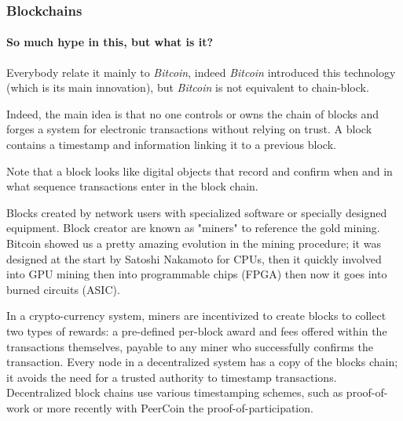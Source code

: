 
\subsubsection{Blockchains}
\paragraph{So much hype in this, but what is it?}
Everybody relate it mainly to \textit{Bitcoin}\cite{SatoshiNakamoto2008Bitcoin:System}, indeed \textit{Bitcoin} introduced this technology (which is its main innovation), but \textit{Bitcoin} is not equivalent to chain-block.

Indeed, the main idea is that no one controls or owns the chain of blocks and forges a system for electronic transactions without relying on trust. A block contains a timestamp and information linking it to a previous block.

Note that a block looks like digital objects that record and confirm when and in what sequence transactions enter in the block chain. 

Blocks created by network users with specialized software or specially designed equipment. Block creator are known as "miners" to reference the gold mining. Bitcoin showed us a pretty amazing evolution in the mining procedure; it was designed at the start by Satoshi Nakamoto for CPUs, then it quickly involved into GPU mining then into programmable chips (FPGA) then now it goes into burned circuits (ASIC).

In a crypto-currency system, miners are incentivized to create blocks to collect two types of rewards: a pre-defined per-block award and fees offered within the transactions themselves, payable to any miner who successfully confirms the transaction.
Every node in a decentralized system has a copy of the blocks chain; it avoids the need for a trusted authority to timestamp transactions. Decentralized block chains use various timestamping schemes, such as proof-of-work or more recently with PeerCoin the proof-of-participation.

